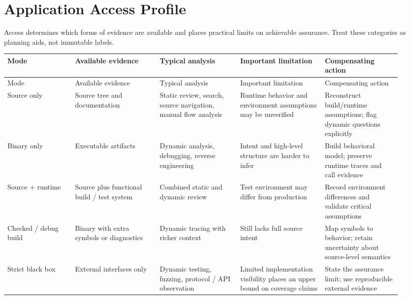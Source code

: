 \documentclass[10pt]{article}
\newcommand{\fieldline}[1]{\textbf{#1}\hspace{0.5em}\leaders\hbox{\rule[0.4ex]{0.6em}{0.35pt}\hspace{0.25em}}\hfill\kern0pt}
\begin{document}
\section{Application Access Profile}
Access determines which forms of evidence are available and places practical limits on achievable assurance. Treat these categories as planning aids, not immutable labels.
\begin{longtable}{@{}L{0.16\linewidth}L{0.20\linewidth}L{0.19\linewidth}L{0.20\linewidth}L{0.18\linewidth}@{}}
\toprule
Mode & Available evidence & Typical analysis & Important limitation & Compensating action \\
\midrule
\endfirsthead
\toprule
Mode & Available evidence & Typical analysis & Important limitation & Compensating action \\
\midrule
\endhead
Source only & Source tree and documentation & Static review, search, source navigation, manual flow analysis & Runtime behavior and environment assumptions may be unverified & Reconstruct build/runtime assumptions; flag dynamic questions explicitly \\
\addlinespace
Binary only & Executable artifacts & Dynamic analysis, debugging, reverse engineering & Intent and high-level structure are harder to infer & Build behavioral model; preserve runtime traces and call evidence \\
\addlinespace
Source + runtime & Source plus functional build / test system & Combined static and dynamic review & Test environment may differ from production & Record environment differences and validate critical assumptions \\
\addlinespace
Checked / debug build & Binary with extra symbols or diagnostics & Dynamic tracing with richer context & Still lacks full source intent & Map symbols to behavior; retain uncertainty about source-level semantics \\
\addlinespace
Strict black box & External interfaces only & Dynamic testing, fuzzing, protocol / API observation & Limited implementation visibility places an upper bound on coverage claims & State the assurance limit; use reproducible external evidence \\
\bottomrule
\end{longtable}

\clearpage
\end{document}
